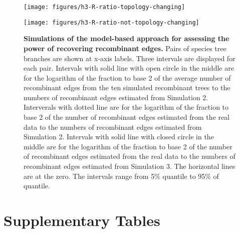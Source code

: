 \documentclass[10pt]{article}
\begin{document}
\begin{figure}

\texttt{[image: figures/h3-R-ratio-topology-changing]}

\texttt{[image: figures/h3-R-ratio-not-topology-changing]}

\caption{
{\bf Simulations of the model-based approach for assessing the power of recovering
recombinant edges.} Pairs of species tree branches are shown at x-axis labels.
Three intervals are displayed for each pair. Intervals with solid line with open
circle in the middle are for the logarithm of the fraction to base 2 of the average
number of recombinant edges from the ten simulated recombinant trees 
to the numbers of recombinant edges estimated from Simulation 2. 
Interverals with dotted line are for the logarithm of the fraction to base 2 of
the number of recombinant edges estimated from the real data
to the numbers of recombinant edges estimated from Simulation 2.
Intervals with solid line with closed circle in the middle are for the logarithm
of the fraction to base 2 of the number of recombinant edges estimated from the real data
to the numbers of recombinant edges estimated from Simulation 3. 
The horizontal lines are at the zero.
The intervals range from 5\% quantile to 95\% of quantile.}
\label{fig:h3}
\end{figure}
\clearpage{}%

\clearpage{}\setcounter{figure}{0}
\setcounter{table}{0}
\renewcommand{\figurename}{Supplementary Figure}
\renewcommand{\tablename}{Supplementary Table}

\section*{Supplementary Tables}
\end{document}
